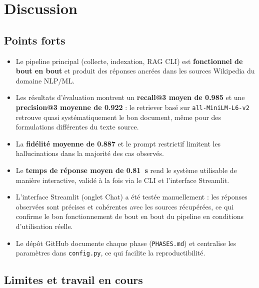 \section{Discussion}
\label{sec:discussion}

\subsection{Points forts}

\begin{itemize}
  \item Le pipeline principal (collecte, indexation, RAG CLI) est \textbf{fonctionnel de bout en
        bout} et produit des r\'eponses ancr\'ees dans les sources Wikipedia du domaine NLP/ML.
  \item Les r\'esultats d'\'evaluation montrent un \textbf{recall@3 moyen de 0.985} et une
        \textbf{precision@3 moyenne de 0.922} : le retriever bas\'e sur \texttt{all-MiniLM-L6-v2}
        retrouve quasi syst\'ematiquement le bon document, m\^eme pour des formulations diff\'erentes
        du texte source.
  \item La \textbf{fid\'elit\'e moyenne de 0.887} et le prompt restrictif limitent les
        hallucinations dans la majorit\'e des cas observ\'es.
  \item Le \textbf{temps de r\'eponse moyen de 0.81~s} rend le syst\`eme utilisable de mani\`ere
        interactive, valid\'e \`a la fois via le CLI et l'interface Streamlit.
  \item L'interface Streamlit (onglet Chat) a \'et\'e test\'ee manuellement : les r\'eponses
        observ\'ees sont pr\'ecises et coh\'erentes avec les sources r\'ecup\'er\'ees, ce qui
        confirme le bon fonctionnement de bout en bout du pipeline en conditions d'utilisation
        r\'eelle.
  \item Le d\'ep\^ot GitHub documente chaque phase (\texttt{PHASES.md}) et centralise les
        param\`etres dans \texttt{config.py}, ce qui facilite la reproductibilit\'e.
\end{itemize}

\subsection{Limites et travail en cours}

